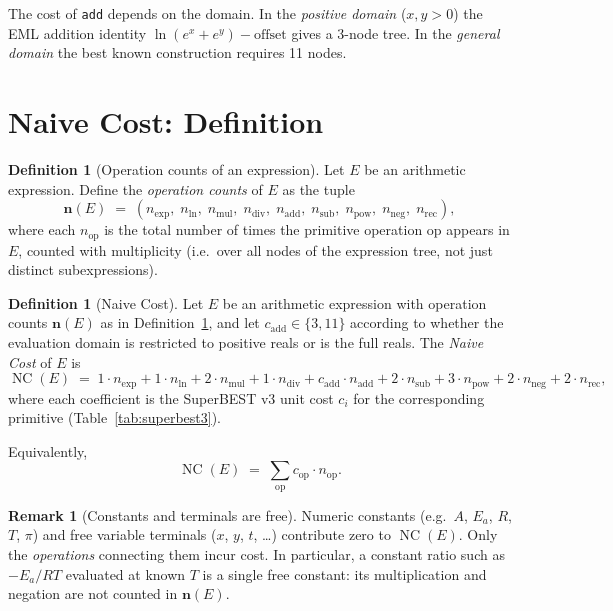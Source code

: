 \documentclass[12pt,a4paper]{article}
\theoremstyle{definition}
\newtheorem{definition}[theorem]{Definition}
\newtheorem{remark}[theorem]{Remark}
\newcommand{\NC}{\operatorname{NC}}
\newcommand{\cadd}{c_{\mathrm{add}}}
\begin{document}
\noindent
The cost of \texttt{add} depends on the domain.
In the \emph{positive domain} ($x,y>0$) the EML addition identity
$\ln(e^x + e^y) - \text{offset}$ gives a 3-node tree.
In the \emph{general domain} the best known construction requires 11 nodes.

\section{Naive Cost: Definition}
\label{sec:definition}

\begin{definition}[Operation counts of an expression]
\label{def:opcounts}
Let $E$ be an arithmetic expression.
Define the \emph{operation counts} of $E$ as the tuple
\[
  \mathbf{n}(E) \;=\;
  (n_{\exp},\; n_{\ln},\; n_{\mathrm{mul}},\; n_{\mathrm{div}},\;
   n_{\mathrm{add}},\; n_{\mathrm{sub}},\; n_{\mathrm{pow}},\;
   n_{\mathrm{neg}},\; n_{\mathrm{rec}}),
\]
where each $n_{\mathrm{op}}$ is the total number of times the primitive
operation $\mathrm{op}$ appears in $E$, counted with multiplicity (i.e.\
over all nodes of the expression tree, not just distinct subexpressions).
\end{definition}

\begin{definition}[Naive Cost]
\label{def:naivcost}
Let $E$ be an arithmetic expression with operation counts
$\mathbf{n}(E)$ as in Definition~\ref{def:opcounts}, and let
$\cadd \in \{3, 11\}$ according to whether the evaluation domain is
restricted to positive reals or is the full reals.
The \emph{Naive Cost} of $E$ is
\begin{equation}
\label{eq:NC}
  \NC(E) \;=\;
    1 \cdot n_{\exp}
  + 1 \cdot n_{\ln}
  + 2 \cdot n_{\mathrm{mul}}
  + 1 \cdot n_{\mathrm{div}}
  + \cadd \cdot n_{\mathrm{add}}
  + 2 \cdot n_{\mathrm{sub}}
  + 3 \cdot n_{\mathrm{pow}}
  + 2 \cdot n_{\mathrm{neg}}
  + 2 \cdot n_{\mathrm{rec}},
\end{equation}
where each coefficient is the SuperBEST v3 unit cost $c_i$ for the
corresponding primitive (Table~\ref{tab:superbest3}).

Equivalently,
\[
  \NC(E) \;=\; \sum_{\mathrm{op}} c_{\mathrm{op}} \cdot n_{\mathrm{op}}.
\]
\end{definition}

\begin{remark}[Constants and terminals are free]
\label{rem:free}
Numeric constants (e.g.\ $A$, $E_a$, $R$, $T$, $\pi$) and free variable
terminals ($x$, $y$, $t$, \ldots) contribute zero to $\NC(E)$.
Only the \emph{operations} connecting them incur cost.
In particular, a constant ratio such as $-E_a/RT$ evaluated at known $T$
is a single free constant: its multiplication and negation are not counted
in $\mathbf{n}(E)$.
\end{remark}
\end{document}
